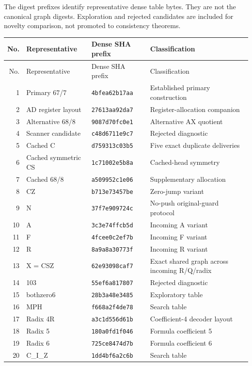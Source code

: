 \small
The digest prefixes identify representative dense table bytes. They are not
the canonical graph digests. Exploration and rejected candidates are included
for novelty comparison, not promoted to consistency theorems.
\begin{longtable}{rlp{.21\linewidth}p{.40\linewidth}}
\toprule No. & Representative & Dense SHA prefix & Classification\\\midrule\endfirsthead
\toprule No. & Representative & Dense SHA prefix & Classification\\\midrule\endhead
1 & Primary 67/7 & \texttt{4bfea62b17aa} & Established primary construction \\
2 & AD register layout & \texttt{27613aa92da7} & Register-allocation companion \\
3 & Alternative 68/8 & \texttt{9087d70fc0e1} & Alternative AX quotient \\
4 & Scanner candidate & \texttt{c48d6711e9c7} & Rejected diagnostic \\
5 & Cached C & \texttt{d759313c03b5} & Five exact duplicate deliveries \\
6 & Cached symmetric CS & \texttt{1c71002e5b8a} & Cached-head symmetry \\
7 & Cached 68/8 & \texttt{a509952c1e06} & Supplementary allocation \\
8 & CZ & \texttt{b713e73457be} & Zero-jump variant \\
9 & N & \texttt{37f7e909724c} & No-push original-guard protocol \\
10 & A & \texttt{3c3e74ffcb5d} & Incoming A variant \\
11 & F & \texttt{4fcee0c2ef7b} & Incoming F variant \\
12 & R & \texttt{8a9a8a30773f} & Incoming R variant \\
13 & X = CSZ & \texttt{62e93098caf7} & Exact shared graph across incoming R/Q/radix \\
14 & 103 & \texttt{55ef6a817807} & Rejected diagnostic \\
15 & bothzero6 & \texttt{28b3a48e3485} & Exploratory table \\
16 & MPH & \texttt{f668a2f4de78} & Search table \\
17 & Radix 4R & \texttt{a3c1d556d61b} & Coefficient-4 decoder layout \\
18 & Radix 5 & \texttt{180a0fd1f046} & Formula coefficient 5 \\
19 & Radix 6 & \texttt{725ce8474d7b} & Formula coefficient 6 \\
20 & C\_I\_Z & \texttt{1dd4bf6a2c6b} & Search table \\

\end{longtable}
